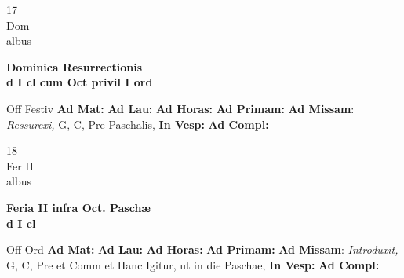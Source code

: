 \documentclass[10pt, openany]{book}
\begin{document}
        \begin{center}
            \begin{minipage}{3.5in}
                \vspace{2em}
                \begin{minipage}{0.5in}
                    {\Huge 17} \\
                    {\normalsize Dom} \\
                    {\normalsize albus}
                \end{minipage}
                \begin{minipage}{3.0in}
                    \textbf{ \large Dominica Resurrectionis \\
                    \textnormal{\normalsize d I cl cum Oct privil I ord}} \\ 
                \end{minipage}
                \begin{justify}Off Festiv
                    \textbf{Ad Mat: }
                    \textbf{Ad Lau: }
                    \textbf{Ad Horas: }
                    \textbf{Ad Primam: }\textbf{Ad Missam}: \textit{Ressurexi,} G, C, Pre Paschalis,  
                    \textbf{In Vesp: }
                    \textbf{Ad Compl: }
                \end{justify}
            \end{minipage}
        \end{center}
    
        \begin{center}
            \begin{minipage}{3.5in}
                \vspace{2em}
                \begin{minipage}{0.5in}
                    {\Huge 18} \\
                    {\normalsize Fer II} \\
                    {\normalsize albus}
                \end{minipage}
                \begin{minipage}{3.0in}
                    \textbf{ \large Feria II infra Oct. Paschæ \\
                    \textnormal{\normalsize d I cl}} \\ 
                \end{minipage}
                \begin{justify}Off Ord
                    \textbf{Ad Mat: }
                    \textbf{Ad Lau: }
                    \textbf{Ad Horas: }
                    \textbf{Ad Primam: }\textbf{Ad Missam}: \textit{Introduxit,} G, C, Pre et Comm et Hanc Igitur, ut in die Paschae,  
                    \textbf{In Vesp: }
                    \textbf{Ad Compl: }
                \end{justify}
            \end{minipage}
        \end{center}
    
\end{document}
